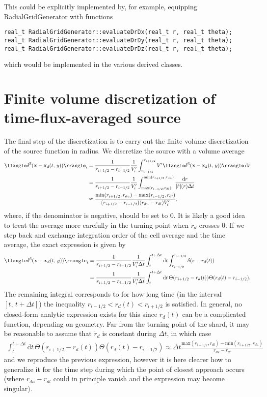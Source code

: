 \documentclass[11pt,a4paper]{article}
\newcommand{\rd}{\ensuremath{\mathrm{d}}}
\renewcommand{\b}[1]{\ensuremath{ {\bf #1 } }}
\begin{document}
This could be explicitly implemented by, for example, equipping RadialGridGenerator with functions
\begin{verbatim}
real_t RadialGridGenerator::evaluateDrDx(real_t r, real_t theta);
real_t RadialGridGenerator::evaluateDrDy(real_t r, real_t theta);
real_t RadialGridGenerator::evaluateDrDz(real_t r, real_t theta);
\end{verbatim}
which would be implemented in the various derived classes. 

\section*{Finite volume discretization of time-flux-averaged source}
The final step of the discretization is to carry out the finite volume discretization of the source function in radius. We discretize the source  with a volume average
\begin{align}
\llangle\delta^3( \b{x} - \b{x}_d(t,\,y)) \rrangle_i &= \frac{1}{r_{i+1/2} - r_{i-1/2}} \frac{1}{V'_i}\int_{r_{i-1/2}}^{r_{i+1/2}}V'\llangle\delta^3( \b{x} - \b{x}_d(t,\,y)) \rrangle  \, \rd r \nonumber \\
&= \frac{1}{r_{i+1/2} - r_{i-1/2}} \frac{1}{V'_i}\int_{\text{max}(r_{i-1/2},r_{dl})}^{\text{min}(r_{i+1/2},r_{du})}\frac{\rd r}{|\dot{r}|(r) \Delta t } \nonumber \\
&\approx \frac{\text{min}(r_{i+1/2},r_{du})-\text{max}(r_{i-1/2},r_{dl})}{(r_{i+1/2} - r_{i-1/2})(r_{du}-r_{dl})V'_i},
\end{align}
where, if the denominator is negative, should be set to 0.
It is likely a good idea to treat the average more carefully in the turning point when $\dot{r}_d$ crosses 0. If we step back and exchange integration order of the cell average and the time average, the exact expression is given by
\begin{align}
\llangle\delta^3( \b{x} - \b{x}_d(t,\,y)) \rrangle_i &= \frac{1}{r_{i+1/2} - r_{i-1/2}} \frac{1}{V'_i\Delta t}\int_t^{t+\Delta t}\rd t \int_{r_{i-1/2}}^{r_{i+1/2}}\delta(r-r_d(t)) \nonumber \\
&=\frac{1}{r_{i+1/2} - r_{i-1/2}} \frac{1}{V'_i\Delta t}\int_t^{t+\Delta t}\rd t \, \Theta(r_{i+1/2} - r_d(t)) \Theta(r_d(t)-r_{i-1/2}).
\end{align}
The remaining integral corresponds to for how long time (in the interval $[t,\,t+\Delta t]$) the inequality $r_{i-1/2} < r_d(t) < r_{i+1/2}$ is satisfied. In general, no closed-form analytic expression exists for this since $r_d(t)$ can be a complicated function, depending on geometry. Far from the turning point of the shard, it may be reasonable to assume that $\dot{r}_d$ is constant during $\Delta t$, in which case 
\begin{align}
\int_t^{t+\Delta t}\rd t \, \Theta(r_{i+1/2} - r_d(t)) \Theta(r_d(t)-r_{i-1/2}) \approx \Delta t \frac{\text{max}(r_{i-1/2},r_{dl})-\text{min}(r_{i+1/2},r_{du})}{r_{du}-r_{dl}}
\end{align}
and we reproduce the previous expression, however it is here clearer how to generalize it for the time step during which the point of closest approach occurs (where $r_{du}-r_{dl}$ could in principle vanish and the expression may become singular).
\end{document}
